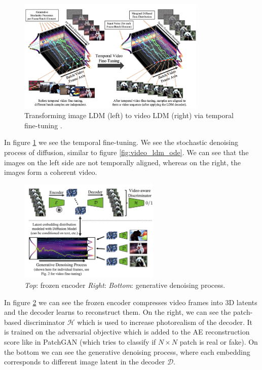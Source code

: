 \begin{figure}
    \centering
    \includegraphics[width=0.8\textwidth]{images/video_ldm/image_to_video_tuning.png}
    \caption{Transforming image LDM (left) to video LDM (right) via temporal fine-tuning \cite{video_ldm}.}
    \label{fig:video_ldm_image_to_video_tuning}
\end{figure}

In figure \ref{fig:video_ldm_image_to_video_tuning} we see the temporal fine-tuning. We see the stochastic denoising process of diffusion, similar to figure \ref{fig:video_ldm_ode}. We can see that the images on the left side are not temporally aligned, whereas on the right, the images form a coherent video.

\begin{figure}
    \centering
    \includegraphics[width=0.6\textwidth]{images/video_ldm/enc_dec_denoise_process.png}
    \caption{\textit{Top}: frozen encoder \textit{Right}:  \textit{Bottom}: generative denoising process. \cite{video_ldm}}
    \label{fig:video_ldm_enc_dec_denoise_process}
\end{figure}

In figure \ref{fig:video_ldm_enc_dec_denoise_process} we can see the frozen encoder compresses video frames into 3D latents and the decoder learns to reconstruct them. On the right, we can see the patch-based discriminator $\mathcal{H}$ which is used to increase photorealism of the decoder. It is trained on the adversarial objective which is added to the AE reconstruction score like in PatchGAN \cite{isola2017image} (which tries to classify if $N \times N$ patch is real or fake). On the bottom we can see the generative denoising process, where each embedding corresponds to different image latent in the decoder $\mathcal{D}$.

